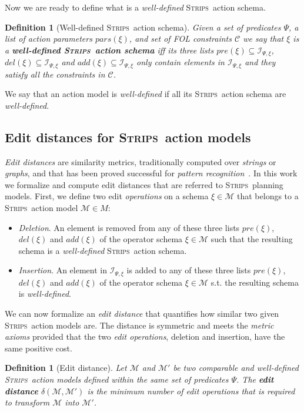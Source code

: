 \documentclass[letterpaper]{article} %
\newcommand{\strips}{\textsc{Strips}}     %
\newtheorem{definition}[theorem]{Definition}
\begin{document}
Now we are ready to define what is a {\em well-defined} \strips\ action schema.
\begin{definition}[Well-defined \strips\ action schema]
Given a set of {\em predicates} $\Psi$, a list of action {\em parameters} $pars(\xi)$, and set of FOL constraints ${\mathcal C}$ we say that $\xi$ is a {\bf well-defined \strips\ action schema} iff its three lists $pre(\xi)\subseteq {\mathcal I}_{\Psi,\xi}$, $del(\xi)\subseteq{\mathcal I}_{\Psi,\xi}$ and $add(\xi)\subseteq{\mathcal I}_{\Psi,\xi}$ only contain elements in ${\mathcal I}_{\Psi,\xi}$ and they satisfy all the constraints in ${\mathcal C}$. 
\end{definition}
We say that an action model is {\em well-defined} if all its \strips\ action schema are {\em well-defined}.

\subsection{Edit distances for \strips\ action models}
{\em Edit distances} are similarity metrics, traditionally computed over {\em strings} or {\em graphs}, and that has been proved successful for {\em pattern recognition}~\cite{masek1980faster,bunke1997relation}. In this work we formalize and compute edit distances that are referred to \strips\ planning models.  First, we define two edit \emph{operations} on a schema $\xi\in\mathcal{M}$ that belongs to a \strips\ action model $\mathcal{M}\in M$:
\begin{itemize}
\item {\em Deletion}. An element is removed from any of these three lists $pre(\xi)$, $del(\xi)$ and $add(\xi)$ of the operator schema $\xi\in\mathcal{M}$ such that the resulting schema is a {\em well-defined} \strips\ action schema.
\item {\em Insertion}. An element in ${\mathcal I}_{\Psi,\xi}$ is added to any of these three lists $pre(\xi)$, $del(\xi)$ and $add(\xi)$ of the operator schema $\xi\in\mathcal{M}$ s.t. the resulting schema is {\em well-defined}.
\end{itemize}

We can now formalize an {\em edit distance} that quantifies how similar two given \strips\ action models are. The distance is symmetric and meets the {\em metric axioms} provided that the two {\em edit operations}, deletion and insertion, have the same positive cost.

\begin{definition}[Edit distance]
  Let $\mathcal{M}$ and $\mathcal{M}'$ be two {\em comparable} and {\em well-defined} \strips\ action models defined within the same set of predicates $\Psi$. The {\bf edit distance} $\delta(\mathcal{M},\mathcal{M}')$ is the minimum number of {\em edit operations} that is required to transform $\mathcal{M}$ into $\mathcal{M}'$.
\end{definition}
\end{document}
